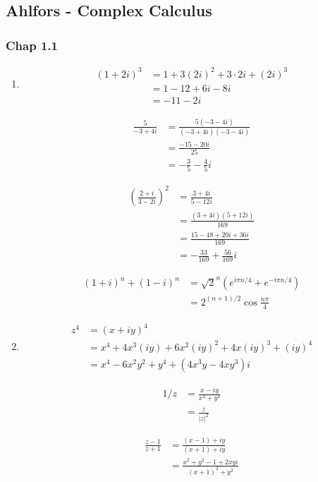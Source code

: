 \documentclass[10pt,a4paper]{article}
\theoremstyle{definition}
\begin{document}
\newpage
\subsection{{\sc Ahlfors} - Complex Calculus}
\subsubsection{Chap 1.1}
\begin{enumerate}
\item\begin{align}
(1+2i)^3
&=1+3(2i)^2+3\cdot2i+(2i)^3\\
&=1-12+6i-8i\\
&=-11-2i
\end{align}

\begin{align}
\frac{5}{-3+4i}
&=\frac{5(-3-4i)}{(-3+4i)(-3-4i)}\\
&=\frac{-15-20i}{25}\\
&=-\frac{3}{5}-\frac{4}{5}i
\end{align}

\begin{align}
\left(\frac{2+i}{3-2i}\right)^2
&=\frac{3+4i}{5-12i}\\
&=\frac{(3+4i)(5+12i)}{169}\\
&=\frac{15-48+20i+36i}{169}\\
&=-\frac{33}{169}+\frac{56}{169}i
\end{align}

\begin{align}
(1+i)^n+(1-i)^n
&=\sqrt{2}^n\left(e^{i\pi n/4}+e^{-i\pi n/4}\right)\\
&=2^{(n+1)/2}\cos\frac{n\pi}{4}
\end{align}

\item
\begin{align}
z^4
&=(x+iy)^4\\
&=x^4+4x^3(iy)+6x^2(iy)^2+4x(iy)^3+(iy)^4\\
&=x^4-6x^2y^2+y^4+(4x^3y-4xy^3)i
\end{align}

\begin{align}
1/z
&=\frac{x-iy}{x^2+y^2}\\
&=\frac{\bar{z}}{|z|^2}
\end{align}

\begin{align}
\frac{z-1}{z+1}
&=\frac{(x-1)+iy}{(x+1)+iy}\\
&=\frac{x^2+y^2-1+2xyi}{(x+1)^2+y^2}
\end{align}

\end{enumerate}
\end{document}
